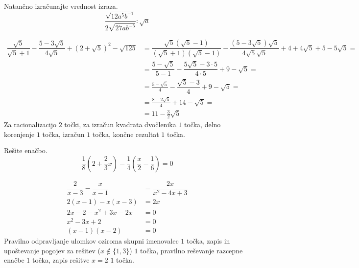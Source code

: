 \documentclass[addpoints]{exam}
\begin{document}
\begin{questions}


    \question[5]
    Natančno izračunajte vrednost izraza.
    $$ \dfrac{\sqrt{12a^5b^{-1}}}{2\sqrt{27ab^{-5}}}:\sqrt{a} $$

    \begin{solution}[7cm]
        \begin{align*} 
            \dfrac{\sqrt{5}}{\sqrt{5}+1}-\dfrac{5-3\sqrt{5}}{4\sqrt{5}}+\left(2+\sqrt{5}\right)^2-\sqrt{125}&=\dfrac{\sqrt{5}(\sqrt{5}-1)}{(\sqrt{5}+1)(\sqrt{5}-1)}-\dfrac{(5-3\sqrt{5})\sqrt{5}}{4\sqrt{5}\sqrt{5}}+4+4\sqrt{5}+5-5\sqrt{5}= \\
                                                                                                            &=\dfrac{5-\sqrt{5}}{5-1}-\dfrac{5\sqrt{5}-3\cdot 5}{4\cdot 5}+9-\sqrt{5}= \\
                                                                                                            &=\frac{5-\sqrt{5}}{4}-\dfrac{\sqrt{5}-3}{4}+9-\sqrt{5}= \\
                                                                                                            &=\frac{8-2\sqrt{5}}{4}+14-\sqrt{5}= \\
                                                                                                            &=11-\frac{3}{2}\sqrt{5}
        \end{align*}
        Za racionalizacijo $2$ točki, za izračun kvadrata dvočlenika $1$ točka, delno korenjenje $1$ točka, izračun $1$ točka, končne rezultat $1$ točka.
    \end{solution}
    
    

    \question[3]
    Rešite enačbo.
    $$ \dfrac{1}{8}\left(2+\dfrac{2}{3}x\right)-\dfrac{1}{4}\left(\dfrac{x}{2}-\dfrac{1}{6}\right)=0 $$
    
    
    \begin{solution}[4cm]
        \begin{align*} 
            \dfrac{2}{x-3}-\dfrac{x}{x-1} &=\dfrac{2x}{x^2-4x+3} \\
            2(x-1)-x(x-3) &= 2x \\
            2x-2-x^2+3x-2x &=0 \\
            x^2-3x+2 &=0 \\
            (x-1)(x-2) &=0
        \end{align*}
        Pravilno odpravljanje ulomkov oziroma skupni imenovalec $1$ točka, zapis in upoštevanje pogojev za rešitev ($x\notin\{1,3\}$) $1$ točka, pravilno reševanje razcepne enačbe $1$ točka, zapis rešitve $x=2$ $1$ točka.
    \end{solution}


\end{questions}
\end{document}
